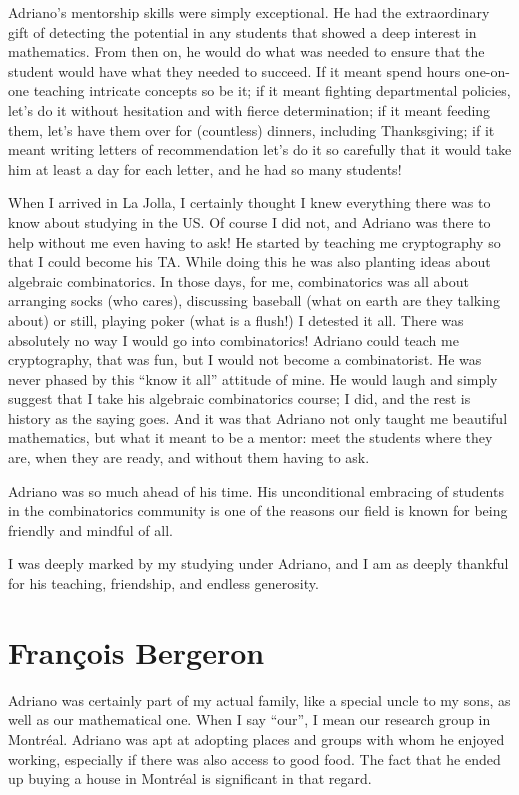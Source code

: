 \documentclass{amsart}
\begin{document}
Adriano’s mentorship skills were simply exceptional.  He had the extraordinary gift of detecting the potential in any students that showed a deep interest in mathematics. From then on, he would do what was needed to ensure that the student would have what they needed to succeed. If it meant spend hours one-on-one teaching intricate concepts so be it; if it meant fighting  departmental policies, let’s do it without hesitation and with fierce determination; if it meant feeding them, let’s have them over for (countless) dinners, including Thanksgiving; if it meant writing letters of recommendation let’s do it so carefully that it would take him at least a day for each letter, and he had so many students!

When I arrived in La Jolla, I certainly thought I knew everything there was to know about studying in the US. Of course I did not, and Adriano was there to help without me even having to ask!   He started by teaching me cryptography so that I could become his TA. While doing this he was also planting ideas about algebraic combinatorics. In those days, for me, combinatorics was all about arranging socks (who cares), discussing baseball (what on earth are they talking about) or still, playing poker (what is a flush!) I detested it all. There was absolutely no way I would go into combinatorics! Adriano could teach me cryptography, that was fun, but I would not become a combinatorist. He was never phased by this ``know it all'' attitude of mine. He would laugh and simply suggest that I take his algebraic combinatorics course; I did, and the rest is history as the saying goes. And it was that Adriano not only taught me beautiful mathematics, but what it meant to be a mentor: meet the students where they are, when they are ready, and without them having to ask.

Adriano was so much ahead of his time. His unconditional embracing of students in the combinatorics community is one of the reasons our field is known for being friendly and mindful of all.

I was deeply marked by my studying under Adriano, and I am as deeply thankful for his teaching, friendship, and endless generosity.

\section*{Fran\c{c}ois Bergeron}
Adriano was certainly part of my actual family, like a special uncle to my sons, as well as our mathematical one. When I say “our”, I mean our research group in Montréal. Adriano was apt at adopting places and groups with whom he enjoyed working, especially if there was also access to good food. The fact that he ended up buying a house in Montréal is significant in that regard.
\end{document}
